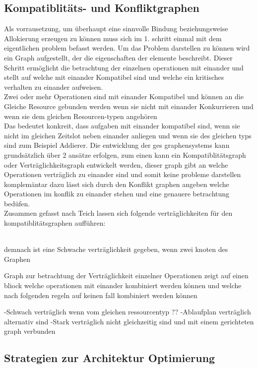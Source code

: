 \documentclass[conference]{IEEEtran}
\begin{document}
\subsection{Kompatiblitäts- und Konfliktgraphen}
Als vorrausetzung, um überhaupt eine sinnvolle Bindung beziehungsweise Allokierung erzeugen zu können muss sich im 1. schritt einmal mit dem eigentlichen problem befasst werden. Um das Problem darstellen zu können wird ein Graph aufgestellt, der die eigenschaften der elemente beschreibt. Dieser Schritt ermöglicht die betrachtung der einzelnen operationen mit einander und stellt auf welche mit einander Kompatibel sind und welche ein kritisches verhalten zu einander aufweisen.\\
Zwei oder mehr Operationen sind mit einander Kompatibel und können an die Gleiche Resource gebunden werden wenn sie nicht mit einander Konkurrieren und wenn sie dem gleichen Resourcen-typen angehören\cite[S.231]{3}\\
Das bedeutet konkreit, dass aufgaben mit einander kompatibel sind, wenn sie nicht im gleichen Zeitslot neben einander anliegen und wenn sie des gleichen typs sind zum Beispiel Addierer.
Die entwicklung der ges graphensystems kann grundsätzlich über 2 ansätze erfolgen, zum einen kann ein Kompatiblitätsgraph oder Verträglichkeitsgraph entwickelt werden, dieser graph gibt an welche Operationen verträglich zu einander sind und somit keine probleme darstellen komplemäntar dazu lässt sich durch den Konflikt graphen angeben welche Operationen im konflik zu einander stehen und eine genauere betrachtung bedüfen.\\
Zusammen gefasst nach  Teich \cite[S. 181-182]{1} lassen sich folgende verträglichkeiten für den kompatiblitätsgraphen aufführen:

\\
demnach ist eine Schwache verträglichkeit gegeben, wenn zwei knoten des Graphen

Graph zur betrachtung der Verträglichkeit einzelner Operationen
zeigt auf einen bliock welche operationen mit einander kombiniert werden können und welche nach folgenden regeln auf keinen fall kombiniert werden können

-Schwach verträglich
wenn vom gleichen ressourcentyp ?? 
-Ablaufplan verträglich
alternativ sind
-Stark verträglich
nicht gleichzeitig sind und mit einem gerichteten graph verbunden 


\subsection{Strategien zur Architektur Optimierung}
\end{document}
